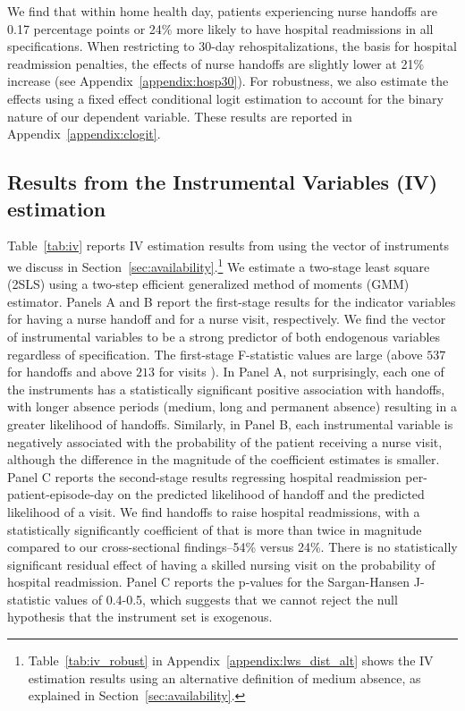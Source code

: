 \documentclass[final,12pt, notitlepage]{article}
\begin{document}
We find that within home health day, patients experiencing nurse handoffs are 0.17 percentage points or 24\% more likely to have hospital readmissions in all specifications.
When restricting to 30-day rehospitalizations, the basis for hospital readmission penalties, the effects of nurse handoffs are slightly lower at 21\% increase (see Appendix~\ref{appendix:hosp30}). For robustness, we also estimate the effects using a fixed effect conditional logit estimation to account for the binary nature of our dependent variable. These results are reported in Appendix~\ref{appendix:clogit}.


\subsection{Results from the Instrumental Variables (IV) estimation} \label{sec:iv}

Table~\ref{tab:iv} reports IV estimation results from using the vector of instruments we discuss in Section~\ref{sec:availability}.\footnote{Table~\ref{tab:iv_robust} in Appendix~\ref{appendix:lws_dist_alt} shows the IV estimation results using an alternative definition of medium absence, as explained in Section~\ref{sec:availability}.
}
We estimate a two-stage least square (2SLS) using a two-step efficient generalized method of moments (GMM) estimator. Panels A and B report the first-stage results for the indicator variables for having a nurse handoff and for a nurse visit, respectively.
We find the vector of instrumental variables to be a strong predictor of both endogenous variables regardless of specification.
The first-stage F-statistic values are large (above $537$ for handoffs and above $213$ for visits ).
In Panel A, not surprisingly, each one of the instruments has a statistically significant positive association with handoffs, with longer absence periods (medium, long and permanent absence) resulting in a greater likelihood of handoffs.
Similarly, in Panel B, each instrumental variable is negatively associated with the probability of the patient receiving a nurse visit, although the difference in the magnitude of the coefficient estimates is smaller.
Panel C reports the second-stage results regressing hospital readmission per-patient-episode-day on the predicted likelihood of handoff and the predicted likelihood of a visit.
We find handoffs to raise hospital readmissions, with a statistically significantly coefficient of that is more than twice in magnitude compared to our cross-sectional findings--54\% versus 24\%.
There is no statistically significant residual effect of having a skilled nursing visit on the probability of hospital readmission.
Panel C reports the p-values for the Sargan-Hansen J-statistic values of 0.4-0.5, which suggests that we cannot reject the null hypothesis that the instrument set is exogenous.
\end{document}
